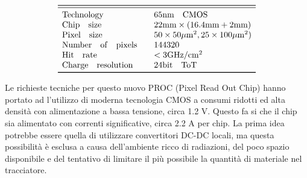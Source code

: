 \[
\begin{array}{ll}

\toprule

\midrule

\mathrm{Technology} & \quad 65 \mathrm{nm \quad CMOS}\\

\mathrm{Chip \quad size} & \quad \mathrm{22 mm \times (16.4 mm + 2 mm)} \\

\mathrm{Pixel \quad size} & \quad \mathrm{50 \times 50 \mu m^2, 25 \times 100 \mu m^2)} \\

\mathrm{Number\quad of\quad pixels} & \quad \mathrm{144320} \\

\mathrm{Hit \quad rate} & \quad \mathrm{< 3 GHz/cm^2} \\

\mathrm{Charge \quad resolution} & \quad \mathrm{24 bit \quad ToT} \\


\bottomrule
\end{array}
\]


Le richieste tecniche per questo nuovo PROC (Pixel Read Out Chip) hanno portato ad l'utilizzo di moderna tecnologia CMOS a consumi ridotti ed alta densità con alimentazione a bassa tensione, circa 1.2 V. Questo fa si che il chip sia alimentato con correnti significative, circa 2.2 A per chip. 
La prima idea potrebbe essere quella di utilizzare convertitori DC-DC locali, ma questa possibilità è esclusa  a causa dell'ambiente ricco di radiazioni, del poco spazio disponibile e del tentativo di limitare il più possibile la quantità di materiale nel tracciatore. 

